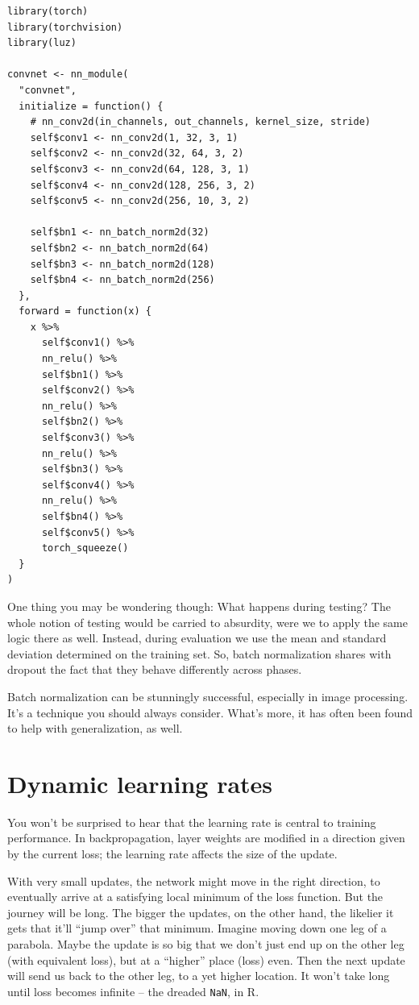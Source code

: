 \documentclass[
  letterpaper,
]{krantz}
\begin{document}
\begin{verbatim}
library(torch)
library(torchvision)
library(luz)

convnet <- nn_module(
  "convnet",
  initialize = function() {
    # nn_conv2d(in_channels, out_channels, kernel_size, stride)
    self$conv1 <- nn_conv2d(1, 32, 3, 1)
    self$conv2 <- nn_conv2d(32, 64, 3, 2)
    self$conv3 <- nn_conv2d(64, 128, 3, 1)
    self$conv4 <- nn_conv2d(128, 256, 3, 2)
    self$conv5 <- nn_conv2d(256, 10, 3, 2)

    self$bn1 <- nn_batch_norm2d(32)
    self$bn2 <- nn_batch_norm2d(64)
    self$bn3 <- nn_batch_norm2d(128)
    self$bn4 <- nn_batch_norm2d(256)
  },
  forward = function(x) {
    x %>%
      self$conv1() %>%
      nn_relu() %>%
      self$bn1() %>%
      self$conv2() %>%
      nn_relu() %>%
      self$bn2() %>%
      self$conv3() %>%
      nn_relu() %>%
      self$bn3() %>%
      self$conv4() %>%
      nn_relu() %>%
      self$bn4() %>%
      self$conv5() %>%
      torch_squeeze()
  }
)
\end{verbatim}

One thing you may be wondering though: What happens during testing? The
whole notion of testing would be carried to absurdity, were we to apply
the same logic there as well. Instead, during evaluation we use the mean
and standard deviation determined on the training set. So, batch
normalization shares with dropout the fact that they behave differently
across phases.

Batch normalization can be stunningly successful, especially in image
processing. It's a technique you should always consider. What's more, it
has often been found to help with generalization, as well.

\hypertarget{dynamic-learning-rates}{%
\section{Dynamic learning rates}\label{dynamic-learning-rates}}

You won't be surprised to hear that the learning rate is central to
training performance. In backpropagation, layer weights are modified in
a direction given by the current loss; the learning rate affects the
size of the update.

With very small updates, the network might move in the right direction,
to eventually arrive at a satisfying local minimum of the loss function.
But the journey will be long. The bigger the updates, on the other hand,
the likelier it gets that it'll ``jump over'' that minimum. Imagine
moving down one leg of a parabola. Maybe the update is so big that we
don't just end up on the other leg (with equivalent loss), but at a
``higher'' place (loss) even. Then the next update will send us back to
the other leg, to a yet higher location. It won't take long until loss
becomes infinite -- the dreaded \texttt{NaN}, in R.
\end{document}
